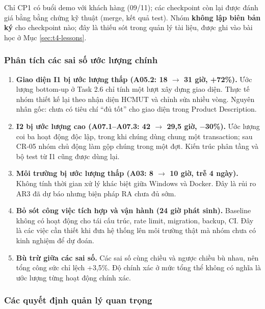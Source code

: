 Chỉ CP1 có buổi demo với khách hàng (09/11); các checkpoint còn lại được đánh giá bằng bằng chứng kỹ thuật (merge, kết quả test). Nhóm \textbf{không lập biên bản ký} cho checkpoint nào; đây là thiếu sót trong quản lý tài liệu, được ghi vào bài học ở Mục \ref{sec:t4-lessons}.

\subsubsection{Phân tích các sai số ước lượng chính}

\begin{enumerate}
    \item \textbf{Giao diện I1 bị ước lượng thấp (A05.2: 18 $\to$ 31 giờ, +72\%).} Ước lượng bottom-up ở Task 2.6 chỉ tính một lượt xây dựng giao diện. Thực tế nhóm thiết kế lại theo nhận diện HCMUT và chỉnh sửa nhiều vòng. Nguyên nhân gốc: chưa có tiêu chí ``đủ tốt'' cho giao diện trong Product Description.
    \item \textbf{I2 bị ước lượng cao (A07.1--A07.3: 42 $\to$ 29,5 giờ, $-$30\%).} Ước lượng coi ba hoạt động độc lập, trong khi chúng dùng chung một transaction; sau CR-05 nhóm chủ động làm gộp chúng trong một đợt. Kiến trúc phân tầng và bộ test từ I1 cũng được dùng lại.
    \item \textbf{Môi trường bị ước lượng thấp (A03: 8 $\to$ 10 giờ, trễ 4 ngày).} Không tính thời gian xử lý khác biệt giữa Windows và Docker. Đây là rủi ro AR3 đã dự báo nhưng biện pháp RA chưa đủ sớm.
    \item \textbf{Bỏ sót công việc tích hợp và vận hành (24 giờ phát sinh).} Baseline không có hoạt động cho tái cấu trúc, rate limit, migration, backup, CI. Đây là các việc cần thiết khi đưa hệ thống lên môi trường thật mà nhóm chưa có kinh nghiệm để dự đoán.
    \item \textbf{Bù trừ giữa các sai số.} Các sai số cùng chiều và ngược chiều bù nhau, nên tổng công sức chỉ lệch +3,5\%. Độ chính xác ở mức tổng thể không có nghĩa là ước lượng từng hoạt động chính xác.
\end{enumerate}

\subsubsection{Các quyết định quản lý quan trọng}

